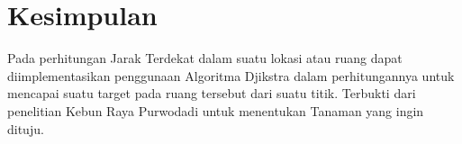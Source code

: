 \documentclass[conference]{IEEEtran}
\begin{document}
	\section{Kesimpulan}
Pada perhitungan Jarak Terdekat dalam suatu lokasi atau ruang dapat diimplementasikan penggunaan Algoritma Djikstra
dalam perhitungannya untuk mencapai suatu target pada ruang
tersebut dari suatu titik. Terbukti dari penelitian Kebun Raya
Purwodadi untuk menentukan Tanaman yang ingin dituju.


	
	
	
\end{document}
